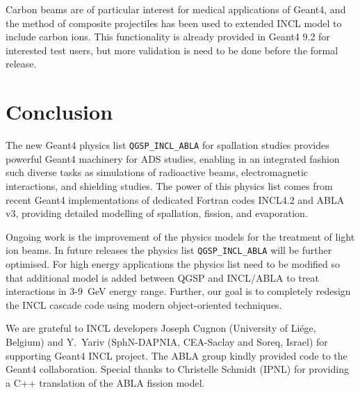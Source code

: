 \documentclass[a4paper]{jpconf}
\begin{document}
Carbon beams are of particular interest for medical applications of Geant4, 
and the method of composite projectiles has been used to extended INCL model to include carbon ions.
This functionality is already provided in Geant4 9.2 for interested test users, 
but more validation is need to be done before the formal release.

\section{Conclusion}\label{sec:conclusion}
The new Geant4 physics list {\tt QGSP\_\-INCL\_ABLA} for spallation studies 
provides powerful Geant4 machinery for ADS studies, enabling in an integrated fashion 
such diverse tasks as simulations of radioactive beams, 
electromagnetic interactions, and shielding studies. 
The power of this physics list comes from recent Geant4 implementations of 
dedicated  Fortran codes INCL4.2 and ABLA v3, providing detailed modelling
of spallation, fission, and evaporation.


Ongoing work is the improvement of the physics models for the treatment of light ion beams.
In future releases the physics list {\tt QGSP\_\-INCL\_ABLA} will be further optimised. 
For high energy applications the physics list need to be modified
so that additional model is added between QGSP and INCL/ABLA to treat interactions in 3-9~GeV energy range.
Further, our goal is to completely redesign the INCL cascade code using modern object-oriented techniques.


\ack %
We are grateful to INCL developers Joseph Cugnon (University of Li\'{e}ge, Belgium) and 
Y.~Yariv (SphN-DAPNIA, CEA-Saclay and Soreq, Israel) for supporting Geant4 INCL project.
The ABLA group kindly provided code to the Geant4 collaboration. 
Special thanks to Christelle Schmidt (IPNL) for providing a C++ translation of 
the ABLA fission model. 


\end{document}
